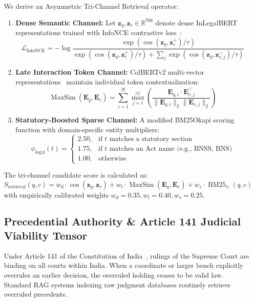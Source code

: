 \documentclass[conference]{IEEEtran}
\begin{document}
We derive an Asymmetric Tri-Channel Retrieval operator:
\begin{enumerate}
    \item \textbf{Dense Semantic Channel:} Let $\mathbf{z}_q, \mathbf{z}_c \in \mathbb{R}^{768}$ denote dense InLegalBERT representations trained with InfoNCE contrastive loss~\cite{oord2018infonce}:
    \begin{equation}
    \mathcal{L}_{\text{InfoNCE}} = -\log \frac{\exp(\cos(\mathbf{z}_q, \mathbf{z}_c^+) / \tau)}{\exp(\cos(\mathbf{z}_q, \mathbf{z}_c^+) / \tau) + \sum_{j} \exp(\cos(\mathbf{z}_q, \mathbf{z}_{c, j}^-) / \tau)}
    \end{equation}
    \item \textbf{Late Interaction Token Channel:} ColBERTv2 multi-vector representations~\cite{santhanam2022colbertv2} maintain individual token contextualization:
    \begin{equation}
    \operatorname{MaxSim}(\mathbf{E}_q, \mathbf{E}_c) = \sum_{i=1}^{|q|} \max_{j=1}^{|c|} \left( \frac{\mathbf{E}_{q, i} \cdot \mathbf{E}_{c, j}^\top}{\|\mathbf{E}_{q, i}\|_2 \|\mathbf{E}_{c, j}\|_2} \right)
    \end{equation}
    \item \textbf{Statutory-Boosted Sparse Channel:} A modified BM25Okapi scoring function with domain-specific entity multipliers:
    \begin{equation}
    \psi_{\text{legal}}(t) = \begin{cases}
    2.50, & \text{if } t \text{ matches a statutory section} \\
    1.75, & \text{if } t \text{ matches an Act name (e.g., BNSS, BNS)} \\
    1.00, & \text{otherwise}
    \end{cases}
    \end{equation}
\end{enumerate}

The tri-channel candidate score is calculated as:
\begin{equation}
S_{\text{retrieval}}(q, c) = w_d \cdot \cos(\mathbf{z}_q, \mathbf{z}_c) + w_l \cdot \operatorname{MaxSim}(\mathbf{E}_q, \mathbf{E}_c) + w_s \cdot \operatorname{BM25}_{\psi}(q, c)
\end{equation}
with empirically calibrated weights $w_d = 0.35, w_l = 0.40, w_s = 0.25$.

\subsection{Precedential Authority \& Article 141 Judicial Viability Tensor}
Under Article 141 of the Constitution of India~\cite{constitution1950}, rulings of the Supreme Court are binding on all courts within India. When a coordinate or larger bench explicitly overrules an earlier decision, the overruled holding ceases to be valid law. Standard RAG systems indexing raw judgment databases routinely retrieve overruled precedents.
\end{document}
